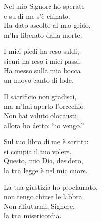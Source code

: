 

\spazio

\strofa Nel mio Signore ho sperato\\
e su di me s'è chinato.\\
Ha dato ascolto al mio grido,\\
m'ha liberato dalla morte.

\spazio


\spazio

\strofa I miei piedi ha reso saldi,\\
sicuri ha reso i miei passi.\\
Ha messo sulla mia bocca\\
un nuovo canto di lode.

\spazio


\spazio

\strofa Il sacrificio non gradisci,\\
ma m'hai aperto l'orecchio.\\
Non hai voluto olocausti,\\
allora ho detto: ``io vengo.''

\spazio


\spazio

\strofa Sul tuo libro di me è scritto:\\
si compia il tuo volere.\\
Questo, mio Dio, desidero,\\
la tua legge è nel mio cuore.

\spazio


\spazio

\strofa La tua giustizia ho proclamato,\\
non tengo chiuse le labbra.\\
Non rifiutarmi, Signore,\\
la tua misericordia.

\spazio

